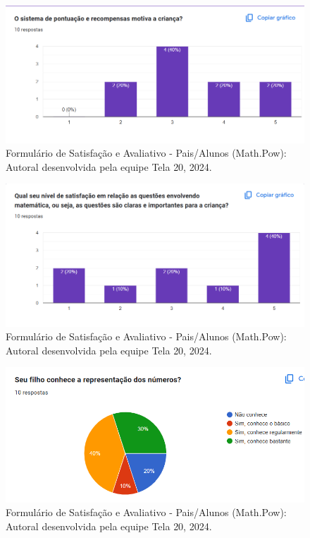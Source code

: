 \documentclass[12pt, openany, oneside, a4paper, english, brazil]{abntex2}   %
\begin{document}
\begin{figure}
    \centering
    \includegraphics{figuras/Formulário Gráficos/Pais/9 O sistema de pontuacao e recompensas motiva a crianca.png}
    \caption{Formulário de Satisfação e Avaliativo  - Pais/Alunos (Math.Pow):  Autoral desenvolvida pela equipe Tela 20, 2024.}
    \label{gráfico gerado pelo formulário}
\end{figure}

\begin{figure}
    \centering
    \includegraphics{figuras/Formulário Gráficos/Pais/10 qual o seu nivel de satistafacao em relacao as questoes envolvendo matematica.png}
    \caption{Formulário de Satisfação e Avaliativo  - Pais/Alunos (Math.Pow):  Autoral desenvolvida pela equipe Tela 20, 2024.}
    \label{gráfico gerado pelo formulário}
\end{figure}

\begin{figure}
    \centering
    \includegraphics{figuras/Formulário Gráficos/Pais/11 seu filho conhece a representação dos números.png}
    \caption{Formulário de Satisfação e Avaliativo  - Pais/Alunos (Math.Pow):  Autoral desenvolvida pela equipe Tela 20, 2024.}
    \label{gráfico gerado pelo formulário}
\end{figure}
\end{document}
